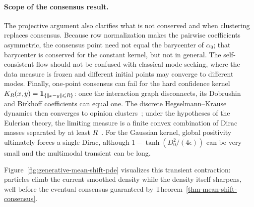 \paragraph{Scope of the consensus result.}
The projective argument also clarifies what is not conserved and when clustering replaces consensus. Because row normalization makes the pairwise coefficients asymmetric, the consensus point need not equal the barycenter of $\alpha_0$; that barycenter is conserved for the constant kernel, but not in general. The self-consistent flow should not be confused with classical mode seeking, where the data measure is frozen and different initial points may converge to different modes. Finally, one-point consensus can fail for the hard confidence kernel $K_R(x,y)=\mathbf{1}_{\{|\!| x-y |\!|\leqslant R\}}$: once the interaction graph disconnects, its Dobrushin and Birkhoff coefficients can equal one. The discrete Hegselmann--Krause dynamics then converges to opinion clusters~\cite{BlondelHendrickxTsitsiklis2009Krause}; under the hypotheses of the Eulerian theory, the limiting measure is a finite convex combination of Dirac masses separated by at least $R$~\cite{CanutoFagnaniTilli2012EulerianKrause}. For the Gaussian kernel, global positivity ultimately forces a single Dirac, although $1-\tanh(D_0^2/(4\epsilon))$ can be very small and the multimodal transient can be long.

Figure~\ref{fig:generative-mean-shift-pde} visualizes this transient contraction: particles climb the current smoothed density while the density itself sharpens, well before the eventual consensus guaranteed by Theorem~\ref{thm-mean-shift-consensus}.

